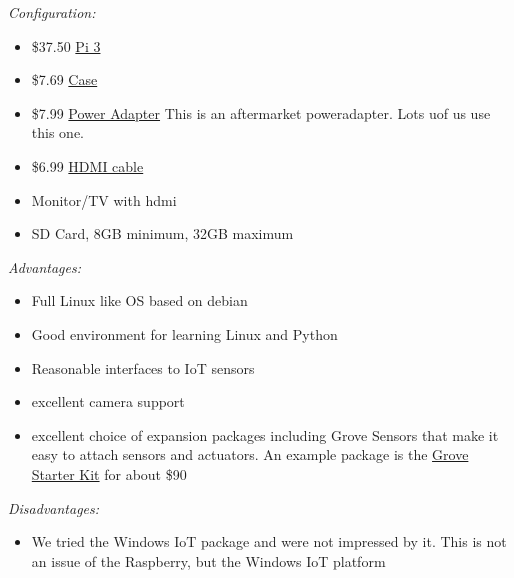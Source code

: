 \emph{Configuration:}

\begin{itemize}

\item
  \$37.50
  \href{https://www.amazon.com/Raspberry-Model-A1-2GHz-64-bit-quad-core/dp/B01CD5VC92/ref=sr_1_1?s=pc\&ie=UTF8\&qid=1499251061\&sr=1-1\&keywords=raspberry+pi+3}{Pi
  3}
\item
  \$7.69
  \href{https://www.amazon.com/Eleduino-Raspberry-Model-Acrylic-Enclosure/dp/B01CQRROLW/ref=sr_1_7?s=electronics\&ie=UTF8\&qid=1499251106\&sr=1-7\&keywords=raspberry+pi+3+case}{Case}
\item
  \$7.99
  \href{https://www.amazon.com/Enokay-Supply-Raspberry-Charger-Adapter/dp/B01MZX466R/ref=sr_1_3?ie=UTF8\&qid=1498443576\&sr=8-3\&keywords=raspberry+pi+power+adapter+micro+usb+switch}{Power
  Adapter} This is an aftermarket poweradapter. Lots uof us use this
  one.
\item
  \$6.99
  \href{https://www.amazon.com/AmazonBasics-High-Speed-HDMI-Cable-Standard/dp/B014I8SSD0/ref=sr_1_3?ie=UTF8\&qid=1499253502\&sr=8-3\&keywords=hdmi+cable}{HDMI
  cable}
\item
  Monitor/TV with hdmi
\item
  SD Card, 8GB minimum, 32GB maximum
\end{itemize}

\emph{Advantages:}

\begin{itemize}

\item
  Full Linux like OS based on debian
\item
  Good environment for learning Linux and Python
\item
  Reasonable interfaces to IoT sensors
\item
  excellent camera support
\item
  excellent choice of expansion packages including Grove Sensors that
  make it easy to attach sensors and actuators. An example package is
  the
  \href{https://www.amazon.com/GrovePi-Starter-Kit-Dexter-Industries/dp/B00TXTZ5SQ/ref=pd_lpo_vtph_147_bs_tr_img_1?_encoding=UTF8\&psc=1\&refRID=45QX6XSNZAG1NT8NES79}{Grove
  Starter Kit} for about \$90
\end{itemize}

\emph{Disadvantages:}

\begin{itemize}

\item
  We tried the Windows IoT package and were not impressed by it. This is
  not an issue of the Raspberry, but the Windows IoT platform
\end{itemize}

